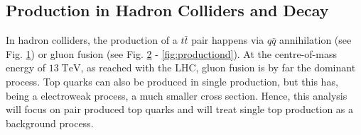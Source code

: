 	\subsection{Production in Hadron Colliders and Decay}
	In hadron colliders, the production of a $t\bar{t}$ pair happens via $q\bar{q}$ annihilation (see Fig. \ref{fig:productiona}) or gluon fusion (see Fig. \ref{fig:productionb} - \ref{fig:productiond}). At the centre-of-mass energy of $13\;\text{TeV}$, as reached with the LHC, gluon fusion is by far the dominant process. Top quarks can also be produced in single production, but this has, being a electroweak process, a much smaller cross section. Hence, this analysis will focus on pair produced top quarks and will treat single top production as a background process.
	\begin{figure}
		\centering
		\begin{subfigure}{.4\textwidth}
		\caption{}
		\label{fig:productiona}
		\end{subfigure}
		\begin{subfigure}{.4\textwidth}
		\caption{}
		\label{fig:productionb}
		\end{subfigure}		
		\begin{subfigure}{.4\textwidth}
\end{subfigure}
\end{figure}
